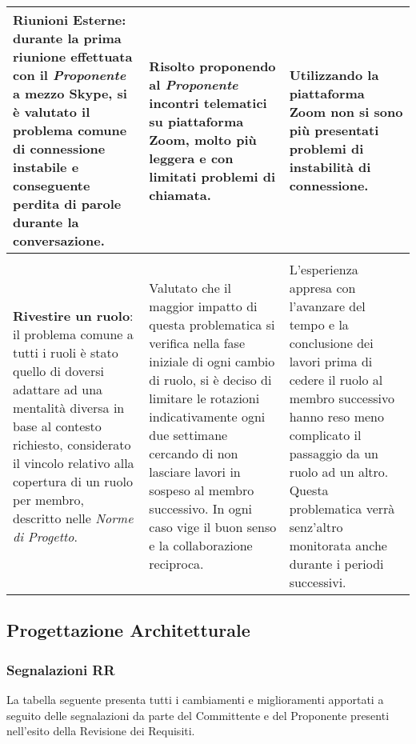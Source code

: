\begin{longtable}{ 
				>{\centering}p{}
				>{\centering}p{}
				>{\centering\arraybackslash}p{}}
				\textbf{Riunioni Esterne}: durante la prima riunione effettuata con il \textit{Proponente}\ped{\textit{G}} a mezzo Skype\ped{\textit{G}}, si è valutato il problema comune di connessione instabile e conseguente perdita di parole durante la conversazione.
					&
				Risolto proponendo al \textit{Proponente}\ped{\textit{G}}	incontri telematici su piattaforma Zoom\ped{\textit{G}}, molto più leggera e con limitati problemi di chiamata.
					&
				Utilizzando la piattaforma Zoom\ped{\textit{G}} non si sono più presentati problemi di instabilità di connessione.
					\\
				
				\hline
				\multicolumn{3}{c}{Ruoli} \\
				\hline
				\textbf{Rivestire un ruolo}: il problema comune a tutti i ruoli è stato quello di doversi adattare ad una mentalità diversa in base al contesto richiesto, considerato il vincolo relativo alla copertura di un ruolo per membro, descritto nelle \textit{Norme di Progetto}.
					&
				Valutato che il maggior impatto di questa problematica si verifica nella fase iniziale di ogni cambio di ruolo, si è deciso di limitare le rotazioni indicativamente ogni due settimane cercando di non lasciare lavori in sospeso al membro successivo. In ogni caso vige il buon senso e la collaborazione reciproca.
					&
				L'esperienza appresa con l'avanzare del tempo e la conclusione dei lavori prima di cedere il ruolo al membro successivo hanno reso meno complicato il passaggio da un ruolo ad un altro. Questa problematica verrà senz'altro monitorata anche durante i periodi successivi.
					\\
				
			\end{longtable}
	
	\subsection{Progettazione Architetturale}
	
		\subsubsection{Segnalazioni RR}
			La tabella seguente presenta tutti i cambiamenti e miglioramenti apportati a seguito delle segnalazioni da parte del Committente e del Proponente presenti nell'esito della Revisione dei Requisiti.
			
